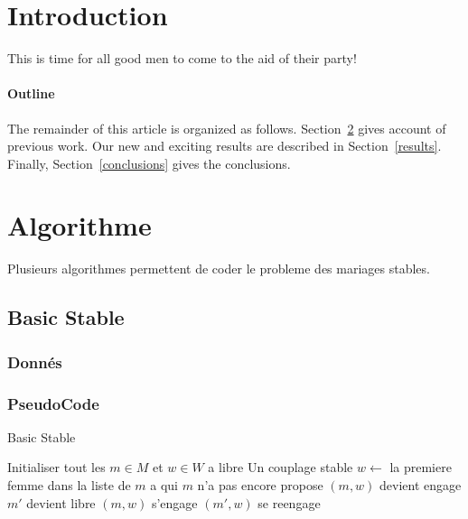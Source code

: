 \documentclass[11pt]{article}
\begin{document}
\maketitle



\section{Introduction}
This is time for all good men to come to the aid of their party!

\paragraph{Outline}
The remainder of this article is organized as follows.
Section~\ref{algo} gives account of previous work.
Our new and exciting results are described in Section~\ref{results}.
Finally, Section~\ref{conclusions} gives the conclusions.

\section{Algorithme}\label{algo}
Plusieurs algorithmes permettent de coder le probleme des mariages stables.

\subsection{Basic Stable}

\subsubsection{Donn\'es}
\subsubsection{PseudoCode}
\begin{algorithm}
\caption{Basic Stable}
\begin{algorithmic} 
\REQUIRE Initialiser tout les $m \in M$ et $w \in W$ a libre
\ENSURE Un couplage stable
\STATE $w \leftarrow$ la premiere femme dans la liste de $m$ a qui $m$ n'a pas
encore propose
\STATE $(m, w)$ devient engage
\STATE $m'$ devient libre
\STATE $(m, w)$ s'engage
\ELSE
\STATE $(m', w)$ se reengage
\ENDIF
\ENDIF
\ENDWHILE
\end{algorithmic}
\end{algorithm}
    
\end{document}
